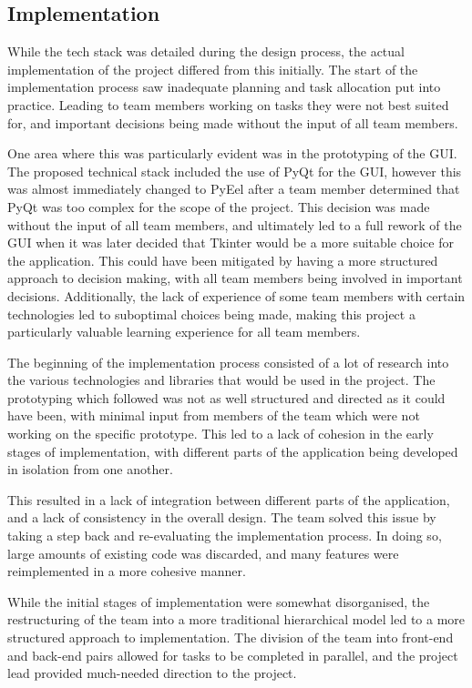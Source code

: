 \documentclass[conference]{IEEEtran}
\begin{document}
\subsection{Implementation}
While the tech stack was detailed during the design process, the actual implementation of the project differed from this initially. The start of the implementation process saw inadequate planning and task allocation put into practice. Leading to team members working on tasks they were not best suited for, and important decisions being made without the input of all team members. 

One area where this was particularly evident was in the prototyping of the GUI. The proposed technical stack included the use of PyQt for the GUI, however this was almost immediately changed to PyEel after a team member determined that PyQt was too complex for the scope of the project. This decision was made without the input of all team members, and ultimately led to a full rework of the GUI when it was later decided that Tkinter would be a more suitable choice for the application. This could have been mitigated by having a more structured approach to decision making, with all team members being involved in important decisions. Additionally, the lack of experience of some team members with certain technologies led to suboptimal choices being made, making this project a particularly valuable learning experience for all team members.

The beginning of the implementation process consisted of a lot of research into the various technologies and libraries that would be used in the project. The prototyping which followed was not as well structured and directed as it could have been, with minimal input from members of the team which were not working on the specific prototype. This led to a lack of cohesion in the early stages of implementation, with different parts of the application being developed in isolation from one another.

This resulted in a lack of integration between different parts of the application, and a lack of consistency in the overall design. The team solved this issue by taking a step back and re-evaluating the implementation process. In doing so, large amounts of existing code was discarded, and many features were reimplemented in a more cohesive manner. 

While the initial stages of implementation were somewhat disorganised, the restructuring of the team into a more traditional hierarchical model led to a more structured approach to implementation. The division of the team into front-end and back-end pairs allowed for tasks to be completed in parallel, and the project lead provided much-needed direction to the project.
\end{document}
